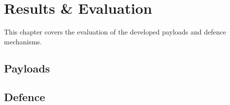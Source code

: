 \chapter{Results \& Evaluation} \label{Results}

This chapter covers the evaluation of the developed payloads and defence mechanisms. 


\section{Payloads}

\section{Defence}
